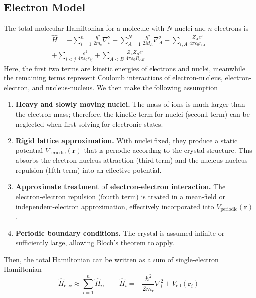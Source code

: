 \documentclass[../../../main.tex]{subfiles}
\begin{document}
\subsection{Electron Model}
The total molecular Hamiltonian for a molecule with $N$ nuclei and $n$ electrons is
\begin{multline*}
    \hat{H} = - \sum_{i=1}^{n} \frac{\hbar^2}{2m_e} \nabla_i^2 - \sum_{A=1}^{N} \frac{\hbar ^2}{2M_A} \nabla_A^2 - \sum_{i,A} \frac{Z_A e^2}{4 \pi \varepsilon_0 r_{iA}}\\
    + \sum_{i<j} \frac{e^2}{4 \pi \varepsilon_0 r_{ij}} + \sum_{A<B} \frac{Z_A Z_B e^2}{4 \pi \varepsilon_0 R_{AB}}
\end{multline*}
Here, the first two terms are kinetic energies of electrons and nuclei, meanwhile the remaining terms represent Coulomb interactions of electron-nucleus, electron-electron, and nucleus-nucleus.
We then make the following assumption
\begin{enumerate}
    \item \textbf{Heavy and slowly moving nuclei.} The mass of ions is much larger than the electron mass; therefore, the kinetic term for nuclei (second term) can be neglected when first solving for electronic states.
    \item \textbf{Rigid lattice approximation.} With nuclei fixed, they produce a static potential $V_{\text{periodic}}(\mathbf{r})$ that is periodic according to the crystal structure. This absorbs the electron-nucleus attraction (third term) and the nucleus-nucleus repulsion (fifth term) into an effective potential.
    \item \textbf{Approximate treatment of electron-electron interaction.} The electron-electron repulsion (fourth term) is treated in a mean-field or independent-electron approximation, effectively incorporated into $V_{\text{periodic}}(\mathbf{r})$.
    \item \textbf{Periodic boundary conditions.} The crystal is assumed infinite or sufficiently large, allowing Bloch’s theorem to apply.
\end{enumerate}
Then, the total Hamiltonian can be written as a sum of single-electron Hamiltonian
\begin{equation*}
    \hat{H}_{\mathrm{elec}} \approx \sum_{i=1}^{n} \hat{H}_{i},\qquad
    \hat{H}_{i} = -\frac{\hbar^{2}}{2m_{e}} \nabla_{i}^{2} + V_{\mathrm{eff}}(\mathbf{r}_{i})
\end{equation*}
\end{document}
